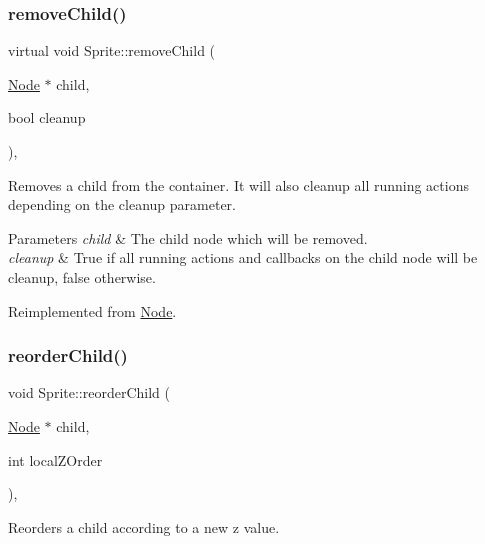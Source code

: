 \subsubsection{\texorpdfstring{remove\+Child()}{removeChild()}\hspace{0.1cm}{\footnotesize\ttfamily [2/2]}}
{\footnotesize\ttfamily virtual void Sprite\+::remove\+Child (\begin{DoxyParamCaption}\item[{\hyperlink{classNode}{Node} $\ast$}]{child,  }\item[{bool}]{cleanup }\end{DoxyParamCaption})\hspace{0.3cm}{\ttfamily [override]}, {\ttfamily [virtual]}}

Removes a child from the container. It will also cleanup all running actions depending on the cleanup parameter.


\begin{DoxyParams}{Parameters}
{\em child} & The child node which will be removed. \\
\hline
{\em cleanup} & True if all running actions and callbacks on the child node will be cleanup, false otherwise. \\
\hline
\end{DoxyParams}


Reimplemented from \hyperlink{classNode_a872d4a7d389b26b0c6ad7ed99c8b1b65}{Node}.

\mbox{\label{classSprite_a128a1da95c110579928bdef1c3dacc78}} 
\subsubsection{\texorpdfstring{reorder\+Child()}{reorderChild()}\hspace{0.1cm}{\footnotesize\ttfamily [1/2]}}
{\footnotesize\ttfamily void Sprite\+::reorder\+Child (\begin{DoxyParamCaption}\item[{\hyperlink{classNode}{Node} $\ast$}]{child,  }\item[{int}]{local\+Z\+Order }\end{DoxyParamCaption})\hspace{0.3cm}{\ttfamily [override]}, {\ttfamily [virtual]}}

Reorders a child according to a new z value.


